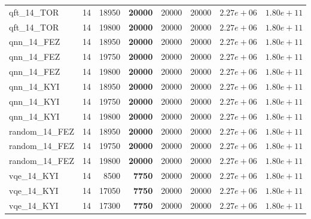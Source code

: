 \begin{table}[ht!]
\begin{tabular}{l c r r r r r r}
qft\_14\_TOR & 14 & 18950 & \textbf{20000} & 20000 & 20000 & $2.27e+06$ & $1.80e+11$ \\
qft\_14\_TOR & 14 & 19800 & \textbf{20000} & 20000 & 20000 & $2.27e+06$ & $1.80e+11$ \\
qnn\_14\_FEZ & 14 & 18950 & \textbf{20000} & 20000 & 20000 & $2.27e+06$ & $1.80e+11$ \\
qnn\_14\_FEZ & 14 & 19750 & \textbf{20000} & 20000 & 20000 & $2.27e+06$ & $1.80e+11$ \\
qnn\_14\_FEZ & 14 & 19800 & \textbf{20000} & 20000 & 20000 & $2.27e+06$ & $1.80e+11$ \\
qnn\_14\_KYI & 14 & 18950 & \textbf{20000} & 20000 & 20000 & $2.27e+06$ & $1.80e+11$ \\
qnn\_14\_KYI & 14 & 19750 & \textbf{20000} & 20000 & 20000 & $2.27e+06$ & $1.80e+11$ \\
qnn\_14\_KYI & 14 & 19800 & \textbf{20000} & 20000 & 20000 & $2.27e+06$ & $1.80e+11$ \\
random\_14\_FEZ & 14 & 18950 & \textbf{20000} & 20000 & 20000 & $2.27e+06$ & $1.80e+11$ \\
random\_14\_FEZ & 14 & 19750 & \textbf{20000} & 20000 & 20000 & $2.27e+06$ & $1.80e+11$ \\
random\_14\_FEZ & 14 & 19800 & \textbf{20000} & 20000 & 20000 & $2.27e+06$ & $1.80e+11$ \\
vqe\_14\_KYI & 14 & 8500 & \textbf{7750} & 20000 & 20000 & $2.27e+06$ & $1.80e+11$ \\
vqe\_14\_KYI & 14 & 17050 & \textbf{7750} & 20000 & 20000 & $2.27e+06$ & $1.80e+11$ \\
vqe\_14\_KYI & 14 & 17300 & \textbf{7750} & 20000 & 20000 & $2.27e+06$ & $1.80e+11$ \\
\bottomrule
\end{tabular}
\end{table}
 \clearpage


